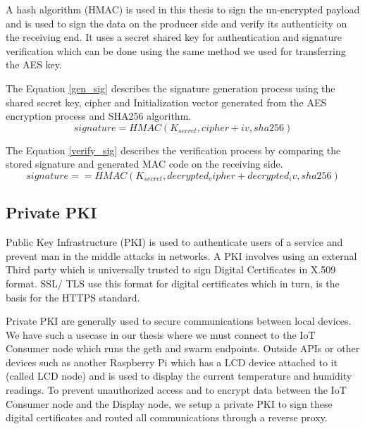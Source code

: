 \documentclass[11pt,openright]{report}
\begin{document}
A hash algorithm (HMAC) is used in this thesis to sign the un-encrypted payload and is used to sign the data on the producer side and verify its authenticity on the receiving end. It uses a secret shared key for authentication and signature verification which can be done using the same method we used for transferring the AES key. 

The Equation \ref{gen_sig} describes the signature generation process using the shared secret key, cipher and Initialization vector generated from the AES encryption process and SHA256 algorithm.
\begin{equation}\label{gen_sig}
    signature = {HMAC(K_{secret}, cipher + iv, sha256)}
\end{equation}

The Equation \ref{verify_sig} describes the verification process by comparing the stored signature and generated MAC code on the receiving side.
\begin{equation}\label{verify_sig}
    signature == {HMAC(K_{secret}, {decrypted_cipher} + {decrypted_iv}, sha256)}
\end{equation}

\subsection{Private PKI} \label{priv_pki}
Public Key Infrastructure (PKI) is used to authenticate users of a service and prevent man in the middle attacks in networks. A PKI involves using an external Third party which is universally trusted to sign Digital Certificates in X.509 format. SSL/ TLS use this format for digital certificates which in turn, is the basis for the HTTPS standard.

Private PKI are generally used to secure communications between local devices. We have such a usecase in our thesis where we must connect to the IoT Consumer node which runs the geth and swarm endpoints. Outside APIs or other devices such as another Raspberry Pi which has a LCD device attached to it (called LCD node) and is used to display the current temperature and humidity readings. To prevent unauthorized access and to encrypt data between the IoT Consumer node and the Display node, we setup a private PKI to sign these digital certificates and routed all communications through a reverse proxy.
\end{document}
